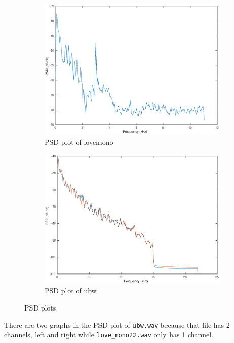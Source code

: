 \documentclass{article}
\begin{document}
\begin{figure}[H]
	\centering
	\begin{subfigure}[b]{0.45\textwidth}
		\centering
		\includegraphics[width=\textwidth]{psd1}
		\caption{PSD plot of lovemono}
		\label{fig:psd1}
	\end{subfigure}
	\hfill
	\begin{subfigure}[b]{0.45\textwidth}
		\centering
		\includegraphics[width=\textwidth]{psd2}
		\caption{PSD plot of ubw}
		\label{fig:psd2}
	\end{subfigure}
	\caption{PSD plots}
\end{figure}

There are two graphs in the PSD plot of \verb|ubw.wav| because that file has 2 channels, left and right while \verb|love_mono22.wav| only has 1 channel.
\end{document}
